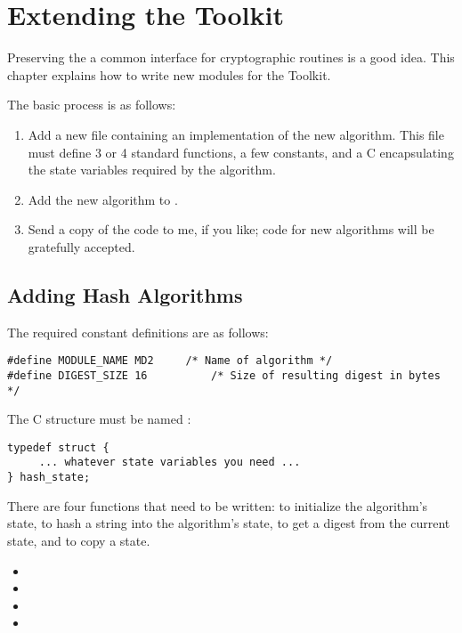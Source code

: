 \documentclass{howto}
\begin{document}
\section{Extending the Toolkit}

Preserving the a common interface for cryptographic routines is a good
idea.  This chapter explains how to write new modules for the Toolkit.

The basic process is as follows:
\begin{enumerate}

\item Add a new  file containing an implementation of the new
algorithm.  
This file must define 3 or 4 standard functions,
a few constants, and a C  encapsulating the state variables required by the algorithm.

\item  Add the new algorithm to .

\item  Send a copy of the code to me, if you like; code for new
algorithms will be gratefully accepted.
\end{enumerate}


\subsection{Adding Hash Algorithms}

The required constant definitions are as follows:

\begin{verbatim}
#define MODULE_NAME MD2		/* Name of algorithm */
#define DIGEST_SIZE 16          /* Size of resulting digest in bytes */
\end{verbatim}

The C structure must be named :

\begin{verbatim}
typedef struct {
     ... whatever state variables you need ...
} hash_state;
\end{verbatim}

There are four functions that need to be written: to initialize the
algorithm's state, to hash a string into the algorithm's state, to get
a digest from the current state, and to copy a state.

\begin{itemize}
  \item {}
  \item {}
  \item {}
  \item {}
\end{itemize}
\end{document}
